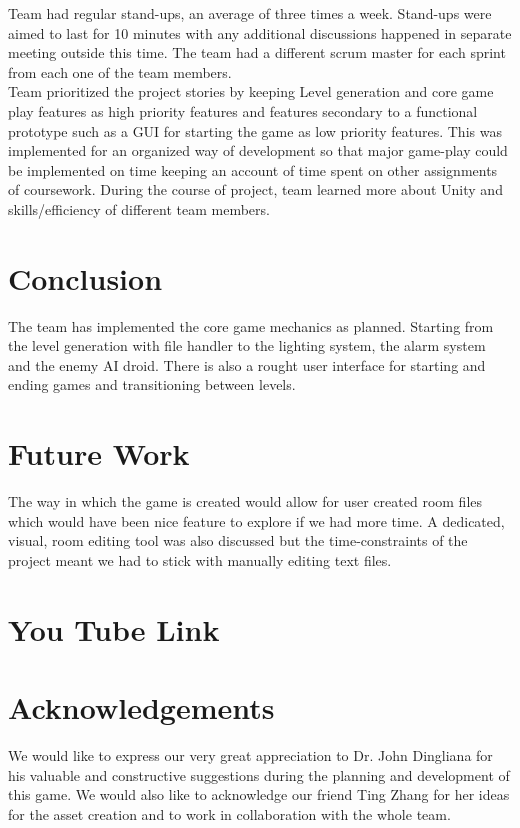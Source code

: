 \documentclass[11pt]{article}
\begin{document}
Team had regular stand-ups, an average of three times a week. Stand-ups were aimed to last for 10 minutes with any additional discussions happened in separate meeting outside this time. The team had a different scrum master for each sprint from each one of the team members.\\

Team prioritized the project stories by keeping Level generation and core game play features as high priority features and features secondary to a functional prototype such as a GUI for starting the game as low priority features. This was implemented for an organized way of development so that major game-play could be implemented on time keeping an account of time spent on other assignments of coursework. During the course of project, team learned more about Unity and skills/efficiency of different team members.

\section{Conclusion}
The team has implemented the core game mechanics as planned. Starting from the level generation with file handler to the lighting system, the alarm system and the enemy AI droid. There is also a rought user interface for starting and ending games and transitioning between levels.\\

\section{Future Work}

The way in which the game is created would allow for user created room files which would have been nice feature to explore if we had more time. A dedicated, visual, room editing tool was also discussed but the time-constraints of the project meant we had to stick with manually editing text files. 

\section{You Tube Link}

\section{Acknowledgements}
We would like to express our very great appreciation to Dr. John Dingliana for his valuable and constructive suggestions during the planning and development of this game. We would also like to acknowledge our friend Ting Zhang for her ideas for the asset creation and to work in collaboration with the whole team.  
\end{document}
